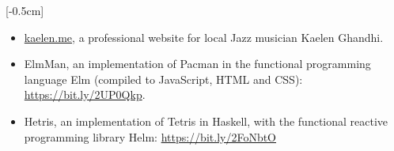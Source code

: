 \documentclass[9pt]{res} %
\begin{document}
\begin{resume}
[-0.5cm]
\begin{itemize} 
\item \url{kaelen.me}, a professional website for local Jazz musician Kaelen Ghandhi. 
\item ElmMan, an implementation of Pacman in the functional programming language Elm (compiled to JavaScript, HTML and CSS): \url{https://bit.ly/2UP0Qkp}.
\item Hetris, an implementation of Tetris in Haskell, with the functional reactive programming library Helm: \url{https://bit.ly/2FoNbtO}

\end{itemize}
\end{resume}
\end{document}
